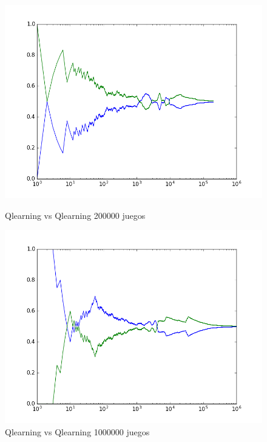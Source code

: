 \begin{figure}[h]
 \centering
 \begin{minipage}{.45\textwidth}	  
	\centering	
	\includegraphics[scale=0.35]{img/QlearningQlearningEgreedy200000.png}
        \caption{Qlearning vs Qlearning 200000 juegos}
  \end{minipage}
 \begin{minipage}{.5\textwidth} 
	\centering	
	\includegraphics[scale=0.35]{img/QlearningQlearningEgreedy1000000.png}
        \caption{Qlearning vs Qlearning 1000000 juegos}
  \end{minipage}
\end{figure}


